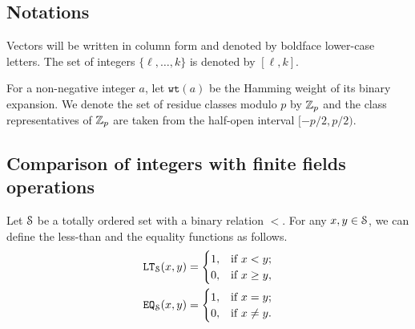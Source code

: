 \subsection{Notations}
  Vectors will be written in column form and denoted by boldface lower-case letters. 
  The set of integers $\{\ell,\ldots,k\}$ is denoted by $[\ell,k]$.
  
  For a non-negative integer $a$, let $\texttt{wt}(a)$ be the Hamming weight of its binary expansion. We denote the set of residue classes modulo $p$ by $\Z_p$ and the class representatives of $\Z_p$ are taken from the half-open interval $[-p/2, p/2)$.

\subsection{Comparison of integers with finite fields operations}
  Let $\S$ be a totally ordered set with a binary relation $<$.
  For any $x,y \in \S$, we can define the less-than and the equality functions as follows.
  \begin{align*}
    \LT_\S(x,y) = 
    \begin{cases}
      1, & \text{if } x < y; \\
      0, & \text{if } x \ge y, \\
    \end{cases}
    \\
    \EQ_\S(x,y) = 
    \begin{cases}
      1, & \text{if } x = y; \\
      0, & \text{if } x \neq y. \\
    \end{cases}
  \end{align*}

